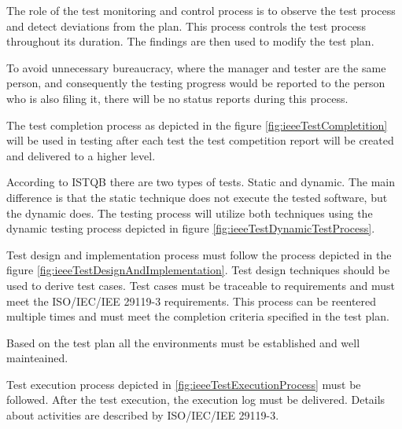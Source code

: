 The role of the test monitoring and control process is to observe the test process and detect deviations from the plan. This process controls the test process throughout its duration. The findings are then used to modify the test plan.

To avoid unnecessary bureaucracy, where the manager and tester are the same person, and consequently the testing progress would be reported to the person who is also filing it, there will be no status reports during this process.

The test completion process as depicted in the figure \ref{fig:ieeeTestCompletition} will be used in testing after each test the test competition report will be created and delivered to a higher level.


According to ISTQB \cite{FoundationOfSoftwareTesting} there are two types of tests. Static and dynamic. The main difference is that the static technique does not execute the tested software, but the dynamic does. The testing process will utilize both techniques using the dynamic testing process depicted in figure \ref{fig:ieeeTestDynamicTestProcess}.


Test design and implementation process must follow the process depicted in the figure \ref{fig:ieeeTestDesignAndImplementation}. Test design techniques should be used to derive test cases. Test cases must be traceable to requirements and must meet the ISO/IEC/IEE 29119-3 requirements. This process can be reentered multiple times and must meet the completion criteria specified in the test plan.


Based on the test plan all the environments must be established and well mainteained.

Test execution process depicted in \ref{fig:ieeeTestExecutionProcess} must be followed. After the test execution, the execution log must be delivered. Details about activities are described by ISO/IEC/IEE 29119-3.

